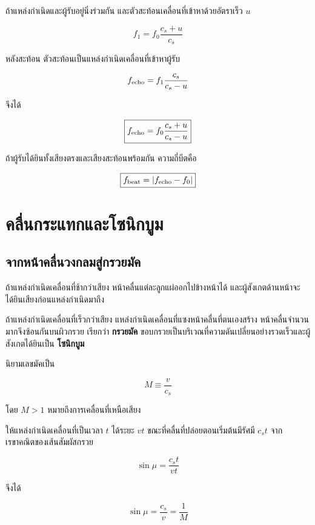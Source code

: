 ถ้าแหล่งกำเนิดและผู้รับอยู่นิ่งร่วมกัน และตัวสะท้อนเคลื่อนที่เข้าหาด้วยอัตราเร็ว $u$

\[
f_1=f_0\frac{c_s+u}{c_s}
\]

หลังสะท้อน ตัวสะท้อนเป็นแหล่งกำเนิดเคลื่อนที่เข้าหาผู้รับ

\[
f_{\rm echo}=f_1\frac{c_s}{c_s-u}
\]

จึงได้

\begin{tcolorbox}[title={ดอปเพลอร์สองครั้งจากตัวสะท้อนที่เคลื่อนที่เข้าหา}]
\[
\boxed{
f_{\rm echo}
=f_0\frac{c_s+u}{c_s-u}
}
\]
\end{tcolorbox}

ถ้าผู้รับได้ยินทั้งเสียงตรงและเสียงสะท้อนพร้อมกัน ความถี่บีตคือ

\[
\boxed{f_{\rm beat}=|f_{\rm echo}-f_0|}
\]

\section{คลื่นกระแทกและโซนิกบูม}

\subsection{จากหน้าคลื่นวงกลมสู่กรวยมัค}

ถ้าแหล่งกำเนิดเคลื่อนที่ช้ากว่าเสียง หน้าคลื่นแต่ละลูกแผ่ออกไปข้างหน้าได้ และผู้สังเกตด้านหน้าจะได้ยินเสียงก่อนแหล่งกำเนิดมาถึง

ถ้าแหล่งกำเนิดเคลื่อนที่เร็วกว่าเสียง แหล่งกำเนิดเคลื่อนที่แซงหน้าคลื่นที่ตนเองสร้าง หน้าคลื่นจำนวนมากจึงซ้อนกันบนผิวกรวย เรียกว่า \textbf{กรวยมัค} ขอบกรวยเป็นบริเวณที่ความดันเปลี่ยนอย่างรวดเร็วและผู้สังเกตได้ยินเป็น \textbf{โซนิกบูม}

นิยามเลขมัคเป็น

\[
\boxed{M\equiv\frac{v}{c_s}}
\]

โดย $M>1$ หมายถึงการเคลื่อนที่เหนือเสียง

ให้แหล่งกำเนิดเคลื่อนที่เป็นเวลา $t$ ได้ระยะ $vt$ ขณะที่คลื่นที่ปล่อยตอนเริ่มต้นมีรัศมี $c_st$ จากเรขาคณิตของเส้นสัมผัสกรวย

\[
\sin\mu=\frac{c_st}{vt}
\]

จึงได้

\begin{tcolorbox}[title={มุมมัค}]
\[
\boxed{
\sin\mu=\frac{c_s}{v}=\frac{1}{M}
}
\]
\end{tcolorbox}

